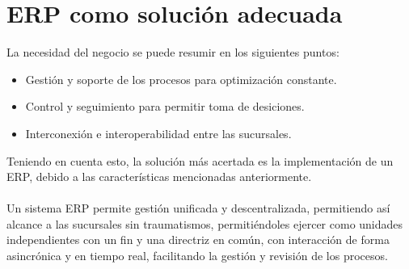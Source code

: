 \chapter{ERP como soluci\'on adecuada}
%
La necesidad del negocio se puede resumir en los siguientes puntos:%
%
\begin{itemize}
\item Gesti\'on y soporte de los procesos para optimizaci\'on constante.
\item Control y seguimiento para permitir toma de desiciones.
\item Interconexi\'on e interoperabilidad entre las sucursales.
\end{itemize}
%
Teniendo en cuenta esto, la soluci\'on m\'as acertada es la implementaci\'on de un ERP, debido a las caracter\'isticas mencionadas anteriormente.%
\\%
\\%
Un sistema ERP permite gesti\'on unificada y descentralizada, permitiendo as\'i alcance a las sucursales sin traumatismos, permiti\'endoles ejercer como unidades independientes con un fin y una directriz en com\'un, con interacci\'on de forma asincr\'onica y en tiempo real, facilitando la gesti\'on y revisi\'on de los procesos.%
